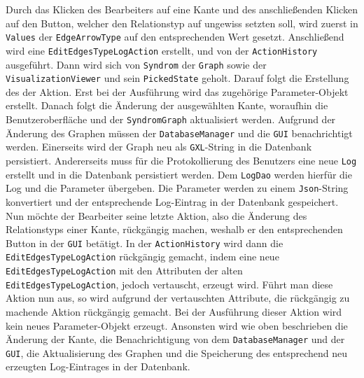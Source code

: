 \documentclass[enabledeprecatedfontcommands,fontsize=11pt,paper=a4,twoside]{scrartcl}
\begin{document}
Durch das Klicken des Bearbeiters auf eine Kante und des anschließenden Klicken auf den Button, welcher den Relationstyp auf ungewiss setzten soll, wird zuerst in \texttt{Values} der \texttt{EdgeArrowType} auf den entsprechenden Wert gesetzt. Anschließend wird eine \texttt{EditEdgesTypeLogAction} erstellt, und von der \texttt{ActionHistory} ausgeführt. Dann wird sich von \texttt{Syndrom} der \texttt{Graph} sowie der \texttt{VisualizationViewer} und sein \texttt{PickedState} geholt. Darauf folgt die Erstellung des der Aktion. Erst bei der Ausführung wird das  zugehörige Parameter-Objekt erstellt. Danach folgt die Änderung der ausgewählten Kante, woraufhin die Benutzeroberfläche und der \texttt{SyndromGraph} aktualisiert werden. Aufgrund der Änderung des Graphen müssen der \texttt{DatabaseManager} und die \texttt{GUI} benachrichtigt werden. Einerseits wird der Graph neu als \texttt{GXL}-String in die Datenbank persistiert. Andererseits muss für die Protokollierung des Benutzers eine neue \texttt{Log} erstellt und in die Datenbank persistiert werden. Dem \texttt{LogDao} werden hierfür die Log und die Parameter übergeben. Die Parameter werden zu einem \texttt{Json}-String konvertiert und der entsprechende Log-Eintrag in der Datenbank gespeichert.  \\

Nun möchte der Bearbeiter seine letzte Aktion, also die Änderung des Relationstyps einer Kante, rückgängig machen, weshalb er den entsprechenden Button in der \texttt{GUI} betätigt. In der \texttt{ActionHistory} wird dann die \texttt{EditEdgesTypeLogAction} rückgängig gemacht, indem eine neue \texttt{EditEdgesTypeLogAction} mit den Attributen der alten \texttt{EditEdgesTypeLogAction}, jedoch vertauscht, erzeugt wird. Führt man diese Aktion nun aus, so wird aufgrund der vertauschten Attribute, die rückgängig zu machende Aktion rückgängig gemacht. Bei der Ausführung dieser Aktion wird kein neues Parameter-Objekt erzeugt. Ansonsten wird wie oben beschrieben die Änderung der Kante, die Benachrichtigung von dem \texttt{DatabaseManager} und der \texttt{GUI}, die Aktualisierung des Graphen und die Speicherung des entsprechend neu erzeugten Log-Eintrages in der Datenbank. 




\end{document}
